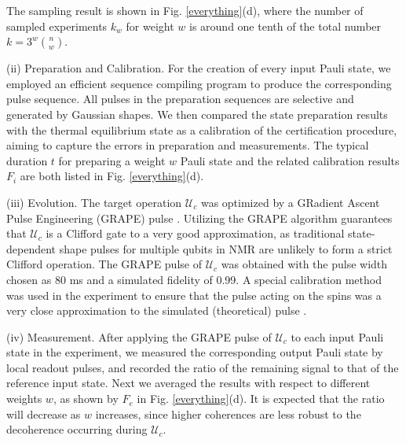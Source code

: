 \documentclass[prl,twocolumn,showpacs,superscriptaddress]{revtex4-1}
\begin{document}
The sampling result is shown in Fig. \ref{everything}(d), where the number of sampled experiments $k_w$ for weight $w$ is around one tenth of the total number $k = 3^w\binom{n}{w}$.

(ii) Preparation and Calibration. For the creation of every input Pauli state, we employed an efficient sequence compiling program \cite{Ryan2008} to produce the corresponding pulse sequence. All pulses in the preparation sequences are selective and generated by Gaussian shapes. We then compared the state preparation results with the thermal equilibrium state as a calibration of the certification procedure, aiming to capture the errors in preparation and measurements. The typical duration $t$ for preparing a weight $w$ Pauli state and the related calibration results $F_i$ are both listed in Fig. \ref{everything}(d).

(iii) Evolution. The target operation $\mathcal{U}_{c}$ was optimized by a GRadient Ascent Pulse Engineering (GRAPE) pulse \cite{Khaneja2005}. Utilizing the GRAPE algorithm guarantees that $\mathcal{U}_{c}$ is a Clifford gate to a very good approximation, as traditional state-dependent shape pulses for multiple qubits in NMR are unlikely to form a strict Clifford operation. The GRAPE pulse of $\mathcal{U}_{c}$ was obtained with the pulse width chosen as 80 ms and a simulated fidelity of 0.99. A special calibration method was used in the experiment to ensure that the pulse acting on the spins was a very close approximation to the simulated (theoretical) pulse \cite{Weinstein2004}.

(iv) Measurement. After applying the GRAPE pulse of $\mathcal{U}_{c}$ to each input Pauli state in the experiment, we measured the corresponding output Pauli state by local readout pulses, and recorded the ratio of the remaining signal to that of the reference input state.  Next we averaged the results with respect to different weights $w$, as shown by $F_e$ in Fig. \ref{everything}(d). It is expected that the ratio will decrease as $w$ increases, since  higher coherences are less robust to the decoherence occurring during   $\mathcal{U}_{c}$.
\end{document}
